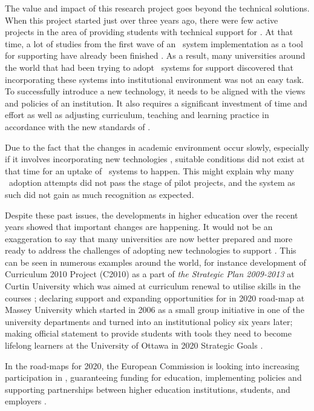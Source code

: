 The value and impact of this research project goes beyond the technical
solutions. When this project started just over three years ago, there were few
active projects in the area of providing students with technical support for
\LLLsn. At that time, a lot of studies from the first wave of an \ep~system
implementation as a tool for supporting \LLLs have already been finished
\citep{Batson2010}. As a result, many universities around the world that had
been trying to adopt \ep~systems for \LLLs support discovered that incorporating
these systems into institutional environment was not an easy task. To
successfully introduce a new technology, it needs to be aligned with the views
and policies of an institution. It also requires a significant investment of
time and effort as well as adjusting curriculum, teaching and learning practice
in accordance with the new standards of \LLLsn.

Due to the fact that the changes in academic environment occur slowly,
especially if it involves incorporating new technologies \citep{Molebash1999},
suitable conditions did not exist at that time for an uptake of \ep~systems to
happen. This might explain why many \ep~adoption attempts did not pass the stage
of pilot projects, and the system as such did not gain as much recognition as
expected.

Despite these past issues, the developments in higher education over the recent
years showed that important changes are happening. It would not be an
exaggeration to say that many universities are now better prepared and more
ready to address the challenges of adopting new technologies to support
\LLLsn. This can be seen in numerous examples around the world, for instance
development of Curriculum 2010 Project (C2010) as a part of \textit{the
Strategic Plan 2009-2013} at Curtin University which was aimed at curriculum
renewal to utilise \LLLs skills in the courses \citep{Oliver2010}; declaring
support and expanding opportunities for \LLLs in 2020 road-map at Massey
University \citep{MasseyUniversity2012} which started in 2006 as a small group
initiative in one of the university departments and turned into an institutional
policy six years later; making official statement to provide students with tools
they need to become lifelong learners at the University of Ottawa in 2020
Strategic Goals \citep{UniversityofOttawa2011}.

In the road-maps for 2020, the European Commission is looking into increasing
participation in \LLLsn, guaranteeing funding for education, implementing \LLLs
policies and supporting partnerships between higher education institutions,
students, and employers \citep{EuropeanCommission2010,EuropeanUnion2009}.

